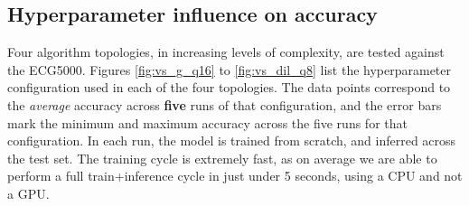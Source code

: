 \subsection{Hyperparameter influence on accuracy}\label{sec:rs_acc_topo}
Four algorithm topologies, in increasing levels of complexity, are tested against the ECG5000. Figures \ref{fig:vs_g_q16} to \ref{fig:vs_dil_q8} list the hyperparameter configuration used in each of the four topologies.
The data points correspond to the \emph{average} accuracy across \textbf{five} runs of that configuration, and the error bars mark the minimum and maximum accuracy across the five runs for that configuration. In each run, the model
is trained from scratch, and inferred across the test set. The training cycle is extremely fast, as on average we are able to perform a full train+inference cycle in just under 5 seconds, using a CPU and not a GPU. 

